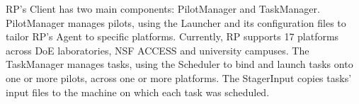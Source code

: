 \documentclass[preprint,12pt, a4paper]{elsarticle}
\begin{document}

RP's Client has two main components: PilotManager and TaskManager. PilotManager
manages pilots, using the Launcher and its configuration files to tailor RP's
Agent to specific platforms. Currently, RP supports 17
platforms~\cite{rp-supported-url} across DoE laboratories, NSF ACCESS and
university campuses. The TaskManager manages tasks, using the Scheduler to bind
and launch tasks onto one or more pilots, across one or more platforms. The
StagerInput copies tasks' input files to the machine on which each task was
scheduled.

\end{document}
